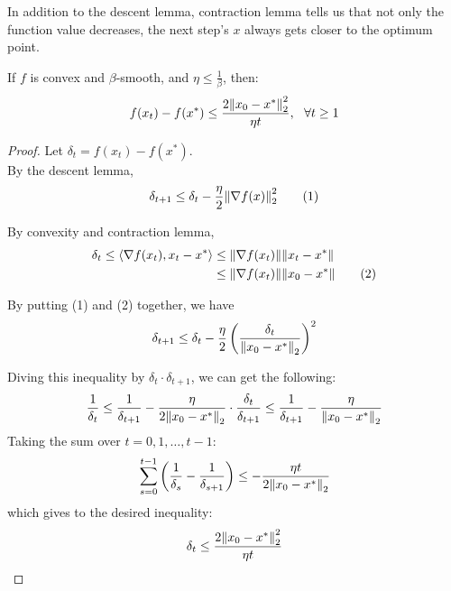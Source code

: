 \begin{remark}
    In addition to the descent lemma, contraction lemma tells us that not only the function value 
    decreases, the next step's \(x\) always gets closer to the optimum point. 
\end{remark}


\begin{theorem}
    If \(f\) is convex and \(\beta\)-smooth, and \(\eta \leq \frac{1}{\beta}\), then: 
    \[
        f(x_t) - f(x^*) \leq \frac{2 \norm{x_0 - x^*}_2^2}{\eta t}, \ \ \forall t \geq 1   
    \]    
\end{theorem}

\begin{proof}
    Let \(\delta_t = f(x_t) - f(x^*)\). \\ 
    By the descent lemma, 
    \begin{align*}
        \delta_{t+1} \leq \delta_t - \frac{\eta}{2} \norm{\nabla f(x)}_2^2 \tag{1}
    \end{align*}

    By convexity and contraction lemma, 
    \begin{align*}
        \delta_t \leq \langle \nabla f(x_t), x_t - x^* \rangle 
        &\leq \norm{ \nabla f(x_t)} \norm{x_t - x^*} \\ 
        &\leq \norm{ \nabla f(x_t)} \norm{x_0 - x^*} \tag{2}
    \end{align*}

    By putting (1) and (2) together, we have 
    \[
        \delta_{t+1} \leq \delta_t - \frac{\eta}{2} \left(\frac{\delta_t}{\norm{x_0 - x^*}_2}\right)^2  
    \]

    Diving this inequality by \(\delta_t \cdot \delta_{t+1}\), we can get the following: 
    \[
        \frac{1}{\delta_t} \leq \frac{1}{\delta_{t+1}} - \frac{\eta}{2 \norm{x_0 - x^*}_2}
        \cdot \frac{\delta_t}{\delta_{t+1}} \leq \frac{1}{\delta_{t+1}} - \frac{\eta}{\norm{x_0 - x^*}_2}
    \]
    Taking the sum over \(t = 0, 1, \ldots, t - 1\): 
    \[
        \sum_{s=0}^{t-1} \left(\frac{1}{\delta_s} - \frac{1}{\delta_{s+1}} \right)
        \leq -   \frac{\eta t}{2 \norm{x_0 - x^*}_2}
    \]
    which gives to the desired inequality: 
    \[
         \delta_t \leq \frac{2 \norm{x_0 - x^*}_2^2}{\eta t}
    \]
\end{proof}

